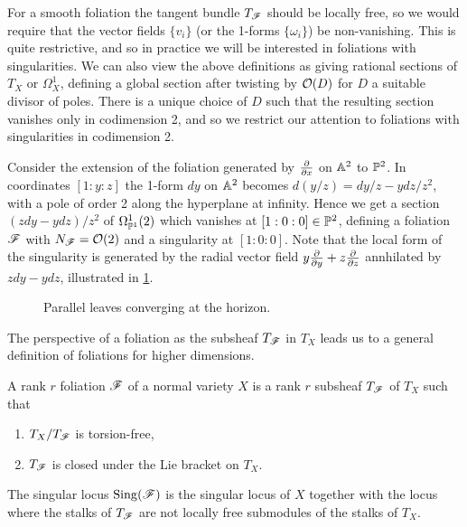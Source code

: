 For a smooth foliation the tangent bundle $T_\scrF$ should be locally free, so
we would require that the vector fields $\{v_i\}$ (or the 1-forms
$\{\omega_i\}$) be non-vanishing. This is quite restrictive, and so in practice
we will be interested in foliations with singularities. We can also view the
above definitions as giving rational sections of $T_X$ or $\Omega^1_X$, defining
a global section after twisting by $\O(D)$ for $D$ a suitable divisor of poles.
There is a unique choice of $D$ such that the resulting section vanishes only in
codimension 2, and so we restrict our attention to foliations with singularities
in codimension 2.

\begin{example}
    Consider the extension of the foliation generated by $\pdv{}{x}$ on $\A^2$
    to $\P^2$. In coordinates $[1:y:z]$ the 1-form $dy$ on $\A^2$ becomes
    $d(y/z)=dy/z-ydz/z^2$, with a pole of order 2 along the hyperplane at
    infinity. Hence we get a section $(zdy-ydz)/z^2$ of $\Omega^1_{\P^1}(2)$
    which vanishes at $[1:0:0]\in\P^2$, defining a foliation $\scrF$ with
    $N_\scrF=\O(2)$ and a singularity at $[1:0:0]$. Note that the local form of
    the singularity is generated by the radial vector field
    $y\pdv{}{y}+z\pdv{}{z}$ annhilated by $zdy-ydz$, illustrated in
    \cref{fig:parallel}.
    \begin{figure}[H]
        \centering
        \caption{Parallel leaves converging at the horizon.}
        \label{fig:parallel}
    \end{figure}
\end{example}

The perspective of a foliation as the subsheaf $T_\scrF$ in $T_X$ leads us to a
general definition of foliations for higher dimensions.

\begin{definition}\label{defn:foliation}
    A rank $r$ foliation $\scrF$ of a normal variety $X$ is a rank $r$ subsheaf
    $T_\scrF$ of $T_X$ such that
    \begin{enumerate}[label=\roman*.]
        \item $T_X/T_\scrF$ is torsion-free,
        \item $T_\scrF$ is closed under the Lie bracket on $T_X$.
    \end{enumerate}
    The singular locus $\Sing(\scrF)$ is the singular locus of $X$ together with
    the locus where the stalks of $T_\scrF$ are not locally free submodules of
    the stalks of $T_X$.
\end{definition}

